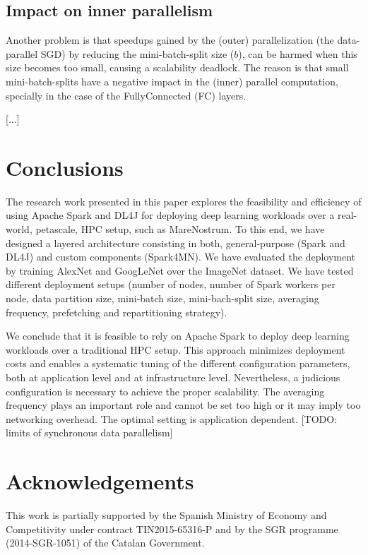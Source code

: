 \documentclass[journal]{IEEEtran}
\begin{document}
\subsection{Impact on inner parallelism}

Another problem is that speedups gained by the (outer) parallelization (the data-parallel SGD) by reducing the mini-batch-split size ($b$), can be harmed when this size becomes too small, causing a scalability deadlock. The reason is that small mini-batch-splits have a negative impact in the (inner) parallel computation, specially in the case of the FullyConnected (FC) layers.

[...]  


\section{Conclusions}
The research work presented in this paper explores the feasibility and efficiency of using Apache Spark and DL4J for 
deploying deep learning workloads over a real-world, petascale, HPC setup, such as MareNostrum.
To this end, we have designed a layered architecture consisting in both, general-purpose (Spark and DL4J) and custom components (Spark4MN). 
We have evaluated the deployment by training AlexNet and GoogLeNet over the ImageNet dataset. We have tested different deployment setups (number of nodes, number of Spark workers per node, data partition size, mini-batch size, mini-bach-split size, averaging frequency, prefetching and repartitioning strategy).  

We conclude that it is feasible to rely on Apache Spark to deploy deep learning workloads over a traditional HPC setup. This approach minimizes deployment costs and enables a systematic tuning of the different configuration parameters, both at application level and at infrastructure level. Nevertheless, a judicious configuration is necessary to achieve the proper scalability. The averaging frequency plays an important role and cannot be set too high or it may imply too networking overhead. The optimal setting is application dependent. [TODO: limits of synchronous data parallelism]


\section*{Acknowledgements}
This work is partially supported by the Spanish Ministry of Economy and Competitivity under contract TIN2015-65316-P and by the SGR programme (2014-SGR-1051) of the Catalan Government.
\end{document}
